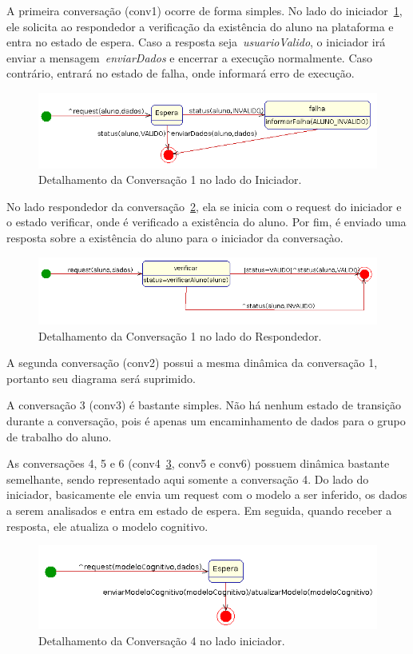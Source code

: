 A primeira conversação (conv1) ocorre de forma simples. No lado do iniciador~\ref{fig:conv1-iniciador}, ele solicita ao respondedor a verificação da existência do aluno na plataforma e entra no estado de espera. Caso a resposta seja~\emph{usuarioValido}, o iniciador irá enviar a mensagem~\emph{enviarDados} e encerrar a execução normalmente. Caso contrário, entrará no estado de falha, onde informará erro de execução.
\begin{figure}
	\centering
	\includegraphics[scale=0.48]{images/conv1-iniciador.png}
	\caption{Detalhamento da Conversação 1 no lado do Iniciador.}
	\label{fig:conv1-iniciador}
\end{figure}
No lado respondedor da conversação~\ref{fig:conv1-respondedor}, ela se inicia com o request do iniciador e o estado verificar, onde é verificado a existência do aluno. Por fim, é enviado uma resposta sobre a existência do aluno para o iniciador da conversaçào.

\begin{figure}
	\centering
	\includegraphics[scale=0.48]{images/conv1-recebedor.png}
	\caption{Detalhamento da Conversação 1 no lado do Respondedor.}
	\label{fig:conv1-respondedor}
\end{figure}

A segunda conversação (conv2) possui a mesma dinâmica da conversação 1, portanto seu diagrama será suprimido.

A conversação 3 (conv3) é bastante simples. Não há nenhum estado de transição durante a conversação, pois é apenas um encaminhamento de dados para o grupo de trabalho do aluno.

As conversações 4, 5 e 6 (conv4~\ref{fig:conv4-iniciador}, conv5 e conv6) possuem dinâmica bastante semelhante, sendo representado aqui somente a conversação 4. Do lado do iniciador, basicamente ele envia um request com o modelo a ser inferido, os dados a serem analisados e entra em estado de espera. Em seguida, quando receber a resposta, ele atualiza o modelo cognitivo.
\begin{figure}
	\centering
	\includegraphics[scale=0.48]{images/conv4-iniciador.png}
	\caption{Detalhamento da Conversação 4 no lado iniciador.}
	\label{fig:conv4-iniciador}
\end{figure}

